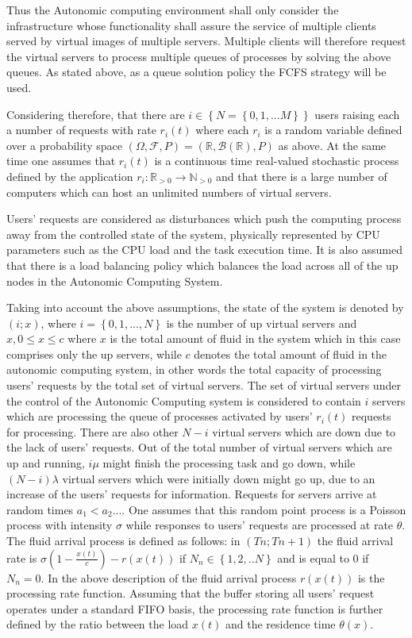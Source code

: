 Thus the Autonomic computing environment shall only consider the infrastructure whose functionality shall assure the service of multiple clients served by virtual images of multiple servers. Multiple clients will therefore request the virtual servers to process multiple queues of processes by solving the above queues. As stated above, as a queue solution policy the FCFS strategy will be used.

Considering therefore, that there are $i \in \left\{N = \left\{ 0, 1, ...M \right\}\right\}$ users raising each a number of requests with rate $r_{i}(t)$ where each $r_{i}$ is a random variable defined over a probability space $(\Omega, \mathcal{F}, P) = (\mathbb{R}, \mathcal{B}(\mathbb{R}), P)$ as above.
At the same time one assumes that $r_{i}(t)$ is a continuous time real-valued stochastic process defined by the application $r_{i}:\mathbb{R}_{>0} \rightarrow \mathbb{N}_{>0}$ \cite{related:model:SeanMeyn2007} and  that there is a large number of computers which can host an unlimited numbers of virtual servers. 

Users' requests are considered as disturbances which push the computing process away from the controlled state of the system,  physically represented by CPU parameters such as the CPU load and the task execution time. It is also assumed that there is a load balancing policy which balances the load across all of the up nodes in the Autonomic Computing System.

Taking into account the above assumptions, the state of the system is denoted by $(i; x)$, where $i = \left\{0, 1,...,N\right\}$ is the number of up virtual servers and $x, 0 \le x \le c$ where $x$ is the total amount of fluid in the system which in this case comprises only the up servers, while $c$ denotes the total amount of fluid in the autonomic computing system, in other words the total capacity of processing users' requests by the total set of virtual servers.
The set of virtual servers under the control of the Autonomic Computing system is considered to contain $i$ servers which are processing the queue of processes activated by users' $r_{i}(t)$ requests for processing. There are also other $N-i$ virtual servers which are down due to the lack of users' requests.  Out of the total number of virtual servers which are up and running, $i\mu$ might finish the processing task and go down, while $(N-i)\lambda$ virtual servers which were initially down might go up, due to an increase of the users' requests for information.
Requests for servers arrive at random times $a_{1} < a_{2} ...$. One assumes that this random point process is a Poisson process with intensity $\sigma$ while responses to users' requests are processed at rate $\theta$.
The fluid arrival process is defined as follows: in $(Tn; Tn+1)$ the fluid arrival rate is $\sigma ( 1-\frac{x(t)}{c}) - r(x(t))$ if $N_{n}\in \left\{1, 2, ..N \right\}$ and is equal to $0$ if $N_{n} = 0$. In the above description of the fluid arrival process $r(x(t))$ is the processing rate function. Assuming that the buffer storing all users' request operates under a standard FIFO basis, the processing rate function is further defined by the ratio between the load $x(t)$ and the residence time $\theta(x)$.

